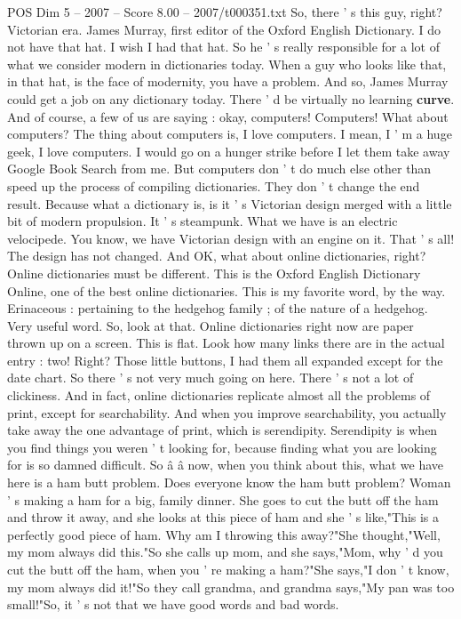 \begin{textsample}{POS Dim 5 – 2007 – Score 8.00 – 2007/t000351.txt}
So, there ' s this guy, right?
Victorian era.
James Murray, first editor of the Oxford English Dictionary.
I do not have that hat.
I wish I had that hat.
So he ' s really responsible for a lot of what we consider modern in dictionaries today.
When a guy who looks like that, in that hat, is the face of modernity, you have a problem.
And so, James Murray could get a job on any dictionary today.
There ' d be virtually no learning \textbf{curve}.
And of course, a few of us are saying : okay, computers!
Computers!
What about computers?
The thing about computers is, I love computers.
I mean, I ' m a huge geek, I love computers.
I would go on a hunger strike before I let them take away Google Book Search from me.
But computers don ' t do much else other than speed up the process of compiling dictionaries.
They don ' t change the end result.
Because what a dictionary is, is it ' s Victorian design merged with a little bit of modern propulsion.
It ' s steampunk.
What we have is an electric velocipede.
You know, we have Victorian design with an engine on it.
That ' s all!
The design has not changed.
And OK, what about online dictionaries, right?
Online dictionaries must be different.
This is the Oxford English Dictionary Online, one of the best online dictionaries.
This is my favorite word, by the way.
Erinaceous : pertaining to the hedgehog family ; of the nature of a hedgehog.
Very useful word.
So, look at that.
Online dictionaries right now are paper thrown up on a screen.
This is flat.
Look how many links there are in the actual entry : two!
Right?
Those little buttons, I had them all expanded except for the date chart.
So there ' s not very much going on here.
There ' s not a lot of clickiness.
And in fact, online dictionaries replicate almost all the problems of print, except for searchability.
And when you improve searchability, you actually take away the one advantage of print, which is serendipity.
Serendipity is when you find things you weren ' t looking for, because finding what you are looking for is so damned difficult.
So â â now, when you think about this, what we have here is a ham butt problem.
Does everyone know the ham butt problem?
Woman ' s making a ham for a big, family dinner.
She goes to cut the butt off the ham and throw it away, and she looks at this piece of ham and she ' s like,"This is a perfectly good piece of ham.
Why am I throwing this away?"She thought,"Well, my mom always did this."So she calls up mom, and she says,"Mom, why ' d you cut the butt off the ham, when you ' re making a ham?"She says,"I don ' t know, my mom always did it!"So they call grandma, and grandma says,"My pan was too small!"So, it ' s not that we have good words and bad words.

\end{textsample}
